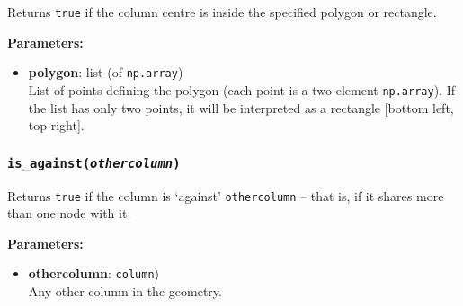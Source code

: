 Returns \texttt{true} if the column centre is inside the specified polygon or rectangle.

\textbf{Parameters:}
\begin{itemize}
\item \textbf{polygon}: list (of \texttt{np.array})\\
  List of points defining the polygon (each point is a two-element \texttt{np.array}).  If the list has only two points, it will be interpreted as a rectangle [bottom left, top right].
\end{itemize}

\begin{snugshade}
\subsubsection{\texttt{is\_against(\emph{othercolumn})}}
\end{snugshade}
\label{sec:column:is_against}

Returns \texttt{true} if the column is `against' \texttt{othercolumn} -- that is, if it shares more than one node with it.

\textbf{Parameters:}
\begin{itemize}
\item \textbf{othercolumn}: \texttt{column})\\
  Any other column in the geometry.
\end{itemize}


